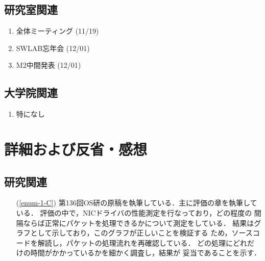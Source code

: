 \documentclass[fleqn, 14pt]{extarticle}
\begin{document}
    \subsection{研究室関連}
    \label{sec-2-2}
    \begin{enumerate}

        \item 全体ミーティング
            \hfill
            \label{enum-18}
            (11/19)

        \item SWLAB忘年会
            \hfill
            \label{enum-18}
            (12/01)

        \item M2中間発表
            \hfill
            \label{enum-18}
            (12/01)

    \end{enumerate}

    \subsection{大学院関連}
    \label{sec2-3}
    \begin{enumerate}

        \item 特になし
            \hfill
            \label{enum-univ1}

    \end{enumerate}

    \section{詳細および反省・感想}
    \label{sec-3}

    \subsection{研究関連}
    \label{sec-3-2}

    \begin{itemize}

        \item[(\ref{enum-1-C})]
            第136回OS研の原稿を執筆している．主に評価の章を執筆している．
            評価の中で，NICドライバの性能測定を行なっており，どの程度の
            間隔ならば正常にパケットを処理できるかについて測定をしている．
            結果はグラフとして示しており，このグラフが正しいことを検証する
            ため，ソースコードを解読し，パケットの処理流れを再確認している．
            どの処理にどれだけの時間がかかっているかを細かく調査し，結果が
            妥当であることを示す．

    \end{itemize}
\end{document}
